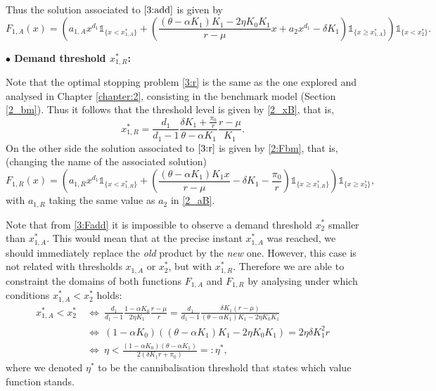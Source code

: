 Thus the solution associated to $\eqref{3:add}$ is given by 
\begin{equation}
F_{1,A}(x)= \left(  a_{1,A}x^{d_1} \mathds{1}_{ \{ x<x^*_{1,A}\}} +
\left(  \frac{(\theta-\alpha K_1)K_1-2 \eta K_0 K_1}{r-\mu} x+
a_2 x^{d_1} - \delta K_1 \right)  \mathds{1}_{ \{ x \geq x^*_{1,A} \}} \right)  \mathds{1}_{ \{   x < x_2^*  \}}.
\label{3:Fadd}
\end{equation}



\textbf{$\bullet$ Demand threshold $x^*_{1,R}$:}

Note that the optimal stopping problem \eqref{3:r} is the same as the one explored and analysed in Chapter \ref{chapter:2}, consisting in the benchmark model (Section \ref{2_bm}).
Thus it follows that the threshold level is given by \eqref{2_xB}, that is,
\begin{equation}
x^*_{1,R}=\frac{d_1}{d_1-1} \frac{ \delta K_1  +\frac{\pi_0}{r} }{\theta-\alpha K_1} \frac{r-\mu}{K_1}.
\label{3_x1R}
\end{equation}
On the other side the solution associated to $\eqref{3:r}$ is given by \eqref{2:Fbm}, that is, (changing the name of the associated solution)
\begin{equation}
F_{1,R}(x)= \left(  a_{1,R}x^{d_1} \mathds{1}_{ \{ x<x^*_{1,R}\}} +
\left(  \frac{(\theta-\alpha K_1)K_1 x}{r-\mu} - \delta K_1  -\frac{\pi_0}{r}\right)  \mathds{1}_{ \{ x \geq x^*_{1,R}\}} \right) \mathds{1}_{ \{ x \geq x^*_2\}} ,
\label{3:Fr}
\end{equation}
with $a_{1,R}$ taking the same value as $a_2$ in \eqref{2_aB}.


Note that from \eqref{3:Fadd} it is impossible to observe a demand threshold $x_2^*$ smaller than $x_{1,A}^*$. This would mean that at the precise instant $x_{1,A}^*$ was reached, we should immediately replace the \textit{old} product by the \textit{new} one. However, this case is not related with thresholds $x_{1,A}$ or $x_2^*$, but with $x_{1,R}^*$.
Therefore we are able to constraint the domains of both functions $F_{1,A}$ and $F_{1,R}$ by analysing under which conditions $x_{1,A}^*<x^*_2$ holds:
\begin{align}
x_{1,A}^*<x_2^* \ &\Leftrightarrow \ \frac{d_1}{d_1-1} \frac{1-\alpha K_0}{2 \eta K_1} \frac{r-\mu}{r} = \frac{d_1}{d_1-1} \frac{\delta K_1 (r-\mu)}{(\theta-\alpha K_1)K_1-2\eta K_0 K_1} \nonumber \\
&\Leftrightarrow \ (1-\alpha K_0) ((\theta-\alpha K_1)K_1-2\eta K_0 K_1)=2 \eta \delta K_1^2 r 
 \nonumber \\
&\Leftrightarrow \ \eta <\frac{(1-\alpha K_0)(\theta-\alpha K_1)}{2(\delta K_1 r + \pi_0)}=: \eta^*, \label{3_eta*}
\end{align}
where we denoted $\eta^*$ to be the cannibalisation threshold that states which value function stands.

